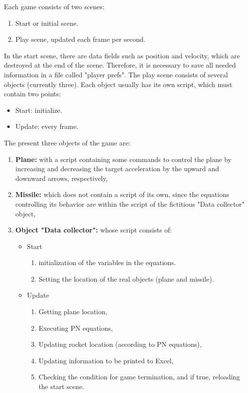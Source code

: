 Each game consists of two scenes:

\begin{enumerate}
	\item Start or initial scene.
	\item Play scene, updated each frame per second.
\end{enumerate}

In the start scene, there are data fields such as position and velocity, which are destroyed at the end of the scene. Therefore, it is necessary to save all needed information in a file called "player prefs". The play scene consists of several objects (currently three). Each object usually has its own script, which must contain two points:
\begin{itemize}
	\item Start: initialize.
	\item Update: every frame.
\end{itemize} 

The present three objects of the game are:
\begin{enumerate}
	\item \textbf{Plane:} with a script containing some commands to control the plane by increasing and decreasing the target acceleration by the upward and downward arrows, respectively,
	\item \textbf{Missile:} which does not contain a script of its own, since the equations controlling its behavior are within the script of the fictitious "Data collector" object,
	\item \textbf{Object "Data collector":} whose script consists of:
	
	\begin{itemize}
		\item Start
		\begin{enumerate}
			\item initialization of the variables in the equations.
			\item Setting the location of the real objects (plane and missile).
		\end{enumerate}
		\item Update 
		\begin{enumerate}
			\item Getting plane location,
			\item Executing PN equations,
			\item Updating rocket location (according to PN equations),
			\item Updating information to be printed to Excel,
			\item Checking the condition for game termination, and if true, reloading the start scene.
		\end{enumerate}
	\end{itemize}


\end{enumerate} 




